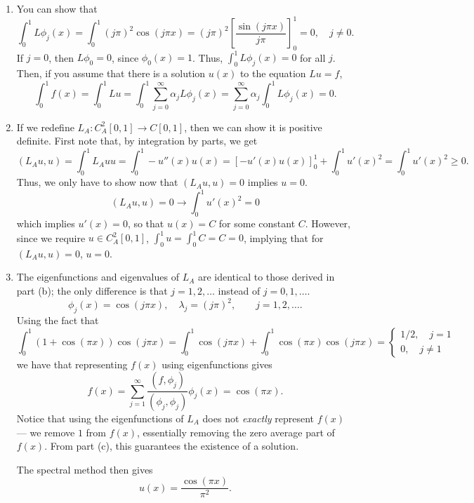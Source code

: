 {\begin{solution}
\begin{enumerate}
\item You can show that 
\[
\int_0^1 L\phi_j(x) = \int_0^1 (j\pi)^2 \cos(j\pi x) = (j\pi)^2 \left[ \frac{\sin(j\pi x)}{j\pi}\right]_0^1 = 0, \quad j \neq 0.  
\]
If $j= 0$, then $L\phi_0 = 0$, since $\phi_0(x) = 1$.  Thus, $\int_0^1 L\phi_j(x) = 0$ for all $j$.  Then, if you assume that there is a solution $u(x)$ to the equation $Lu = f$,
\[
\int_0^1 f(x) = \int_0^1 Lu = \int_0^1 \sum_{j=0}^\infty \alpha_j L\phi_j(x) = \sum_{j=0}^\infty \alpha_j \int_0^1 L\phi_j(x)  = 0.
\]
\item If we redefine $L_A: C^2_A[0,1] \rightarrow C[0,1]$, then we can show it is positive definite.  First note that, by integration by parts, we get
\[
(L_A u,u) = \int_0^1 L_A u u = \int_0^1 -u''(x) u(x) = [-u'(x) u(x)]_0^1 + \int_0^1 u'(x)^2 = \int_0^1 u'(x)^2 \geq 0.
\]
Thus, we only have to show now that $(L_Au,u) = 0$ implies $u = 0$.  
\[
(L_Au,u) = 0 \rightarrow \int_0^1 u'(x)^2 = 0
\]
which implies $u'(x) = 0$, so that $u(x) = C$ for some constant $C$.  However, since we require $u \in C^2_A[0,1]$, $\int_0^1 u = \int_0^1 C = C = 0$, implying that for $(L_Au,u) = 0$, $u = 0$.  
\item The eigenfunctions and eigenvalues of $L_A$ are identical to those derived in part (b); the only difference is that $j = 1, 2, \ldots$ instead of $j = 0,1,\ldots$.  
\[
\phi_j(x) = \cos(j\pi x), \quad \lambda_j = (j\pi)^2, \qquad j = 1,2,\ldots.
\]
Using the fact that 
\[
\int_0^1 \left(1 + \cos(\pi x)\right)\cos(j\pi x) = \int_0^1\cos(j\pi x) + \int_0^1 \cos(\pi x)\cos(j\pi x) = \begin{cases}
1/2, \quad j = 1\\
0, \quad j\neq 1
\end{cases}
\]
we have that representing $f(x)$ using eigenfunctions gives
\[
f(x) = \sum_{j=1}^\infty \frac{(f,\phi_j)}{(\phi_j,\phi_j)}\phi_j(x) = \cos(\pi x).  
\]
Notice that using the eigenfunctions of $L_A$ does not \emph{exactly} represent $f(x)$ --- we remove $1$ from $f(x)$, essentially removing the zero average part of $f(x)$.  From part (c), this guarantees the existence of a solution.  

The spectral method then gives
\[
u(x) = \frac{\cos(\pi x)}{\pi^2}.
\]
\end{enumerate}
\end{solution}
}{}